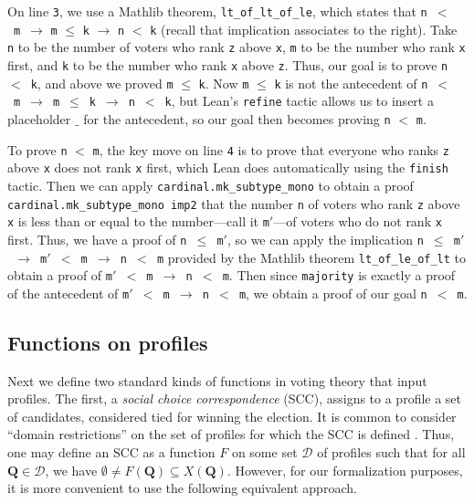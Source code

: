 \documentclass[runningheads]{llncs}
\begin{document}
On line \texttt{3}, we use a Mathlib theorem, \texttt{lt\_of\_lt\_of\_le}, which states that \texttt{n}~$<$~\texttt{m}~$\to$ \texttt{m} $\leq$ \texttt{k} $\to$ \texttt{n} $<$ \texttt{k} (recall that implication associates to the right). Take \texttt{n} to be the number of voters who rank \texttt{z} above \texttt{x}, \texttt{m} to be the number who rank \texttt{x} first, and \texttt{k} to be the number  who rank \texttt{x} above \texttt{z}. Thus, our goal is to prove \texttt{n}~$<$~\texttt{k}, and above we proved  \texttt{m} $\leq$ \texttt{k}. Now \texttt{m} $\leq$ \texttt{k} is not the antecedent of \texttt{n}~$<$~\texttt{m}~$\to$~\texttt{m}~$\leq$~\texttt{k}~$\to$~\texttt{n}~$<$~\texttt{k}, but Lean's \texttt{refine} tactic allows us to insert a placeholder $\_$ for the antecedent, so our goal then becomes proving  \texttt{n} $<$ \texttt{m}. 

To prove \texttt{n} $<$ \texttt{m}, the key move on line \texttt{4} is to prove that everyone who ranks \texttt{z} above \texttt{x} does not rank \texttt{x} first, which Lean does automatically using the \texttt{finish} tactic. Then we can apply \texttt{cardinal.mk\_subtype\_mono} to obtain a proof \texttt{cardinal.mk\_subtype\_mono imp2} that the number \texttt{n} of voters who rank \texttt{z} above \texttt{x} is less than or equal to the number---call it \texttt{m}$'$---of voters who do not rank \texttt{x} first. Thus, we have a proof of \texttt{n~$\leq$~m$'$}, so we can apply the implication  \texttt{n~$\leq$~m$'$~$\to$~m$'$~$<$~m~$\to$~n~$<$ m} provided by the Mathlib theorem \texttt{lt\_of\_le\_of\_lt} to obtain a proof of \texttt{m$'$  $<$ m $\to$ n $<$ m}. Then since \texttt{majority} is exactly a proof of the antecedent of \texttt{m$'$  $<$ m $\to$ n $<$ m}, we obtain a proof of our goal \texttt{n $<$ m}.




\subsection{Functions on profiles}

Next we define two standard kinds of functions in voting theory that input profiles. The first, a \textit{social choice correspondence} (SCC), assigns to a profile a set of candidates, considered tied for winning the election. It is common to consider ``domain restrictions'' on the set of profiles for which the SCC is defined \cite{Gaertner2001}. Thus, one may define an SCC as a function $F$ on some set $\mathcal{D}$ of profiles such that for all $\mathbf{Q}\in\mathcal{D}$, we have ${\emptyset\neq F(\mathbf{Q})\subseteq X(\mathbf{Q})}$. However, for our formalization purposes, it is more convenient to use the following equivalent approach.
\end{document}
